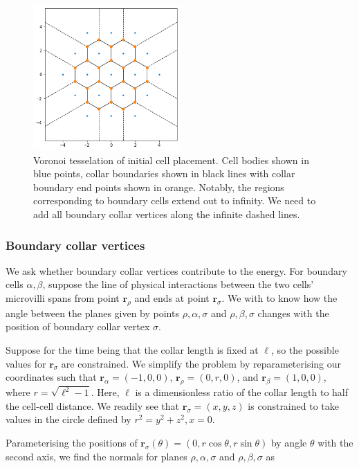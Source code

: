 \begin{figure}[htbp]
    \centering
    \includegraphics[width=0.5\textwidth]{voronoi.png}
    \caption{Voronoi tesselation of initial cell placement. Cell bodies shown in blue points, collar boundaries shown in black lines with collar boundary end points shown in orange. Notably, the regions corresponding to boundary cells extend out to infinity. We need to add all boundary collar vertices along the infinite dashed lines.}
    \label{fig:voronoi}
\end{figure}

\subsubsection{Boundary collar vertices} \label{subsubsec:bdary_verts}

We ask whether boundary collar vertices contribute to the energy. For boundary cells $\alpha, \beta$, suppose the line of physical interactions between the two cells' microvilli spans from point $\bm{r}_\rho$  and ends at point $\bm{r}_\sigma$. We with to know how the angle between the planes given by points $\rho, \alpha, \sigma$ and $\rho, \beta, \sigma$ changes with the position of boundary collar vertex $\sigma$. 

Suppose for the time being that the collar length is fixed at $\ell$, so the possible values for $\bm{r}_\sigma$ are constrained. We simplify the problem by reparameterising our coordinates such that $\bm{r}_\alpha = (-1, 0, 0)$, $\bm{r}_\rho = (0, r, 0)$, and $\bm{r}_\beta = (1, 0, 0)$, where $r = \sqrt{\ell^2 - 1}$. Here, $\ell$ is a dimensionless ratio of the collar length to half the cell-cell distance. We readily see that $\bm{r}_\sigma = (x, y, z)$ is constrained to take values in the circle defined by $r^2 = y^2 + z^2, x=0$. 

Parameterising the positions of $\bm{r}_\sigma(\theta) = (0, r\cos\theta, r\sin\theta)$ by angle $\theta$ with the second axis, we find the normals for planes $\rho, \alpha, \sigma$ and $\rho, \beta, \sigma$ as 

